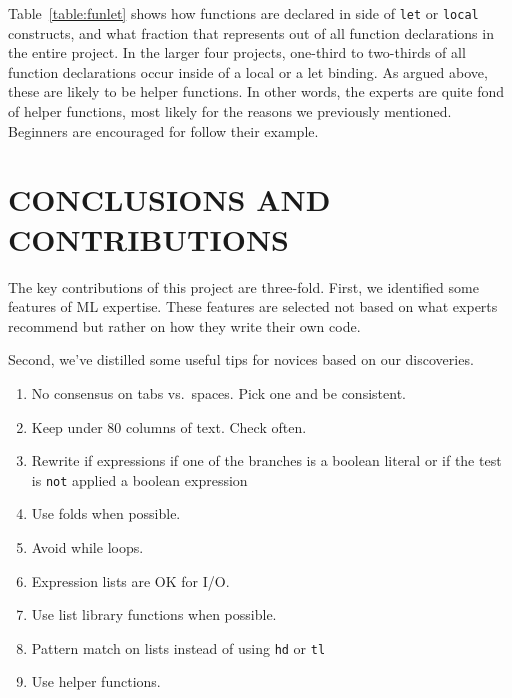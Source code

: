 \documentclass[12pt,abstracton]{scrartcl}
\begin{document}
Table~\ref{table:funlet} shows how functions are declared in side of \texttt{let} or \texttt{local}
constructs, and what fraction that represents out of all function declarations in the
entire project.
In the larger four projects, one-third to two-thirds of all function declarations occur
inside of a local or a let binding. As argued above, these are likely to be helper functions.
In other words, the experts are quite fond of helper functions, most likely for
the reasons we previously mentioned. Beginners are encouraged for follow their example.
\section{CONCLUSIONS AND CONTRIBUTIONS}\label{sec:future}
The key contributions of this project are three-fold. First, we
identified some features of ML expertise. These features are
selected not based on what experts recommend but rather on how they
write their own code.

Second, we've distilled some useful tips for novices based
on our discoveries.
\begin{enumerate}
\item No consensus on tabs vs.\ spaces. Pick one and be consistent.
\item Keep under 80 columns of text. Check often.
\item Rewrite if expressions if one of the branches is a boolean literal or if the test is \texttt{not} applied a boolean expression
\item Use folds when possible.
\item Avoid while loops.
\item Expression lists are OK for I/O.
\item Use list library functions when possible.
\item Pattern match on lists instead of using \texttt{hd} or \texttt{tl}
\item Use helper functions.
\end{enumerate}
\end{document}
